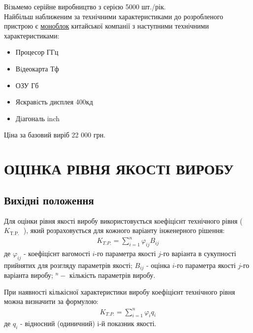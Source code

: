 \documentclass[a4paper,14pt]{extreport}
\begin{document}
    Візьмемо серійне виробництво з серією 5000 шт./рік.\\ 

    Найбільш наближеним за технічними характеристиками до розробленого
    пристрою  є  \href{https://www.itbox.ua/ua/product/Kompyuter_HP_24-df0054ua_IPS_Pentium_J5040_426F3EA-p702646/?utm=shopping&utm_content=shopping&gclid=CjwKCAiAtdGNBhAmEiwAWxGcUoFSjhq16_yyk_vusMuu-Nb1aAfwNXYS7bWDjVH86uK1hBbyGcG11BoCPasQAvD_BwE}{моноблок}  китайської  компанії  з  наступними  технічними
    характеристиками:
    \begin{itemize}
    \item Процесор  ГГц 
    \item Вiдеокарта  Тф
    \item ОЗУ  Гб
    \item Яскравiсть дисплея \dotfill 400кд
    \item Дiагональ  inch
    \end{itemize}
    Ціна за базовий виріб 22 000 грн.



\chapter{ОЦІНКА РІВНЯ ЯКОСТІ ВИРОБУ}

\section{Вихідні положення}
    Для оцінки рівня якості виробу використовується коефіціснт технічного рівня ( $K_{\text {T.P. }}$ ), який розраховується для кожного варіанту інженерного рішення:
    \begin{align}
    K_{T . P .}=\sum_{i=1}^{n} \varphi_{i j} B_{i j}
    \end{align}
    де $\varphi_{i j}$ - коефіціснт вагомості $i$-го параметра якості $j$-го варіанта в сукупності прийнятих для розгляду параметрів якості; $B_{i j}$ - оцінка $i$-го параметра якості $j$-го варіанта виробу; $^{n}-$ кількість параметрів виробу.

    При наявності кількісної характеристики виробу коефіцієнт технічного рівня можна визначити за формулою:
    \begin{align}\label{qqq}
    K_{T. P.}=\sum_{i=1}^{n} \varphi_{i} q_{i}
    \end{align}
    де $q_{i}$ - відносний (одиничний)   i-й показник якості. 
\end{document}
